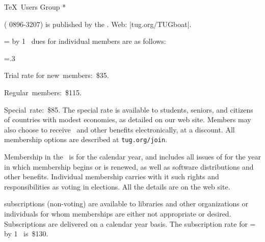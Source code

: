 


\TUBfinal

\def\rateyear{\the\year}
\def\rateyear{\count255=\year\advance\count255 by 1 \the\count255}
\def\tug{\acro{TUG}}
\def\rtitle{}

\def\USA{U\kern-.12em.\kern.04em S\kern-.06em.\kern.06em A\null.}

\head * \TeX\ Users Group *

\TUB\/ ( 0896-3207) is published by the\newline
\TUG{}. Web: |tug.org/TUGboat|.

\bigskip {}

\noindent
\rateyear\ dues for individual members are as follows:

\begingroup
\raggedstretch=.3\colwd
\raggedright
{}
\item{\bull} Trial rate for new~members:~\$35.
\item{\bull} Regular~members:~\$115.
\item{\bull} Special~rate:~\$85.
\unskip\endgraf
\endgroup       %
\noindent The special rate is available to students, seniors, and
citizens of countries with modest economies, as detailed on our web
site.
Members may also choose to receive \TUB\ and other benefits
electronically, at a discount. All membership options are described at
{\tt tug.org/join}.

Membership in the \TUG\ is for the calendar year, and includes all issues
of \TUB\/ for the year in which membership begins or is renewed, as well
as software distributions and other benefits.
Individual membership carries with
it such rights and responsibilities as voting in  elections.
All the details are on the  web site.

\bigskip {}

\noindent \TUB\/ subscriptions (non-voting) are available to libraries
and other organizations or individuals for whom 
memberships are either not appropriate or desired.
Subscriptions are delivered on a calendar year basis.
The subscription rate for
\rateyear\ is~\$130.

